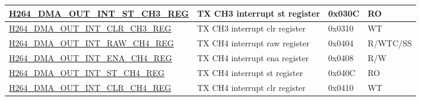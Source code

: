 \begin{longtable}{ | p{7.5cm} | p{5.7cm} | p{1.2cm} | p{1cm} | }
    \hyperref[regdesc:H264DMAOUTINTSTCH3REG]{H264\_DMA\_OUT\_INT\_ST\_CH3\_REG} & TX CH3  interrupt st register & 0x030C & RO \\ \hline
    \hyperref[regdesc:H264DMAOUTINTCLRCH3REG]{H264\_DMA\_OUT\_INT\_CLR\_CH3\_REG} & TX CH3  interrupt clr register & 0x0310 & WT \\ \hline
    \hyperref[regdesc:H264DMAOUTINTRAWCH4REG]{H264\_DMA\_OUT\_INT\_RAW\_CH4\_REG} & TX CH4  interrupt raw register & 0x0404 & R/WTC/SS \\ \hline
    \hyperref[regdesc:H264DMAOUTINTENACH4REG]{H264\_DMA\_OUT\_INT\_ENA\_CH4\_REG} & TX CH4  interrupt ena register & 0x0408 & R/W \\ \hline
    \hyperref[regdesc:H264DMAOUTINTSTCH4REG]{H264\_DMA\_OUT\_INT\_ST\_CH4\_REG} & TX CH4  interrupt st register & 0x040C & RO \\ \hline
    \hyperref[regdesc:H264DMAOUTINTCLRCH4REG]{H264\_DMA\_OUT\_INT\_CLR\_CH4\_REG} & TX CH4  interrupt clr register & 0x0410 & WT \\ \hline
    

\end{longtable}
